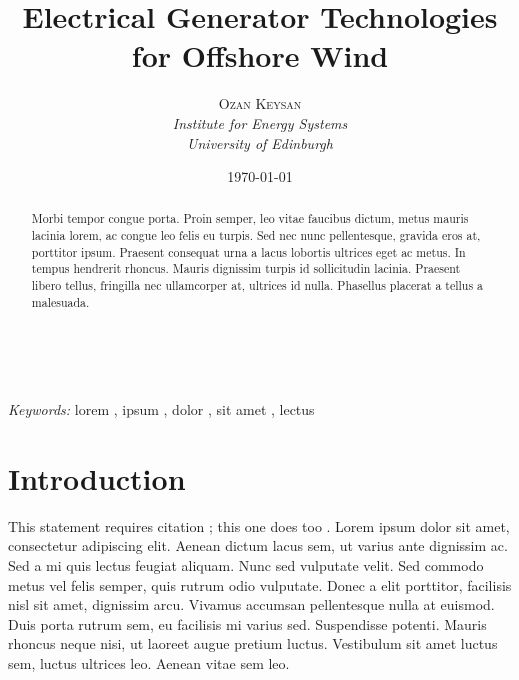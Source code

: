 \documentclass[a4paper, 11pt]{article} %
\title{\textbf{Electrical Generator Technologies for Offshore Wind}} %
\author{\textsc{Ozan Keysan} %
\\{\textit{Institute for Energy  Systems\\ University of Edinburgh}}} %
\date{\today} %
\makeatletter
\renewcommand{\maketitle}{ %
\begin{flushright} %
{\LARGE\@title} %

\vspace{50pt} %

{\large\@author} %
\\\@date %

\vspace{40pt} %
\end{flushright}
}
\makeatother
\begin{document}
\maketitle %



\begin{abstract}
Morbi tempor congue porta. Proin semper, leo vitae faucibus dictum, metus mauris lacinia lorem, ac congue leo felis eu turpis. Sed nec nunc pellentesque, gravida eros at, porttitor ipsum. Praesent consequat urna a lacus lobortis ultrices eget ac metus. In tempus hendrerit rhoncus. Mauris dignissim turpis id sollicitudin lacinia. Praesent libero tellus, fringilla nec ullamcorper at, ultrices id nulla. Phasellus placerat a tellus a malesuada.
\end{abstract}

\hspace*{3,6mm}\textit{Keywords:} lorem , ipsum , dolor , sit amet , lectus %

\vspace{30pt} %


\section*{Introduction}

This statement requires citation \cite{Smith:2012qr}; this one does too \cite{Smith:2013jd}. Lorem ipsum dolor sit amet, consectetur adipiscing elit. Aenean dictum lacus sem, ut varius ante dignissim ac. Sed a mi quis lectus feugiat aliquam. Nunc sed vulputate velit. Sed commodo metus vel felis semper, quis rutrum odio vulputate. Donec a elit porttitor, facilisis nisl sit amet, dignissim arcu. Vivamus accumsan pellentesque nulla at euismod. Duis porta rutrum sem, eu facilisis mi varius sed. Suspendisse potenti. Mauris rhoncus neque nisi, ut laoreet augue pretium luctus. Vestibulum sit amet luctus sem, luctus ultrices leo. Aenean vitae sem leo.
\end{document}
